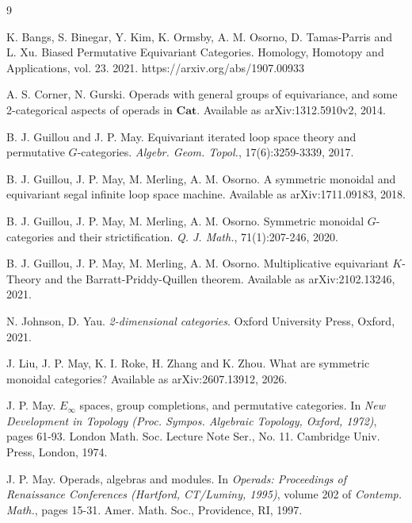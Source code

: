 \documentclass[openany, amssymb, psamsfonts]{amsart}
\theoremstyle{definition}
\numberwithin{equation}{section}
\newcommand{\Cat}{\mathbf{Cat}} %
\begin{document}
\begin{thebibliography}{9}

K. Bangs, S. Binegar, Y. Kim, K. Ormsby, A. M. Osorno, D. Tamas-Parris and L. Xu.
Biased Permutative Equivariant Categories.
Homology, Homotopy and Applications, vol. 23.
2021.
https://arxiv.org/abs/1907.00933


A. S. Corner, N. Gurski.
Operads with general groups of equivariance, and some 2-categorical aspects of operads in $\Cat$.
Available as arXiv:1312.5910v2, 2014.

B. J. Guillou and J. P. May.
Equivariant iterated loop space theory and permutative $G$-categories.
\emph{Algebr. Geom. Topol.}, 17(6):3259-3339, 2017.

B. J. Guillou, J. P. May, M. Merling, A. M. Osorno.
A symmetric monoidal and equivariant segal infinite loop space machine.
Available as arXiv:1711.09183, 2018.

B. J. Guillou, J. P. May, M. Merling, A. M. Osorno.
Symmetric monoidal $G$-categories and their strictification.
\emph{Q. J. Math.}, 71(1):207-246, 2020.

B. J. Guillou, J. P. May, M. Merling, A. M. Osorno.
Multiplicative equivariant $K$-Theory and the Barratt-Priddy-Quillen theorem.
Available as arXiv:2102.13246, 2021.

N. Johnson, D. Yau.
\emph{2-dimensional categories}.
Oxford University Press, Oxford, 2021.


J. Liu, J. P. May, K. I. Roke, H. Zhang and K. Zhou.
What are symmetric monoidal categories?
Available as arXiv:2607.13912, 2026.

J. P. May. $E_\infty$ spaces, group completions, and permutative categories. In \emph{New Development in Topology (Proc. Sympos. Algebraic Topology, Oxford, 1972)}, pages 61-93. London Math. Soc. Lecture Note Ser., No. 11. Cambridge Univ. Press, London, 1974.

J. P. May. Operads, algebras and modules. In \emph{Operads: Proceedings of Renaissance Conferences (Hartford, CT/Luminy, 1995)}, volume 202 of \emph{Contemp. Math.}, pages 15-31. Amer. Math. Soc., Providence, RI, 1997. 


\end{thebibliography}
\end{document}
